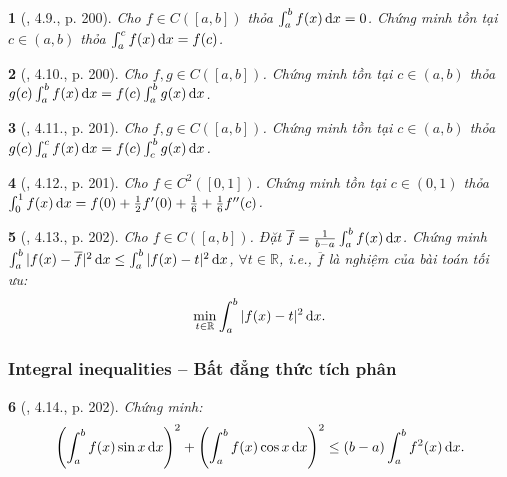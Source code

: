 \documentclass{article}
\newtheorem{baitoan}{}
\begin{document}
\begin{baitoan}[\cite{Quoc_Long_Dat_Nam_VMC}, 4.9., p. 200]
	Cho $f\in C([a,b])$ thỏa $\int_a^b f(x)\,{\rm d}x = 0$. Chứng minh tồn tại $c\in(a,b)$ thỏa $\int_a^c f(x)\,{\rm d}x = f(c)$.
\end{baitoan}

\begin{baitoan}[\cite{Quoc_Long_Dat_Nam_VMC}, 4.10., p. 200]
	Cho $f,g\in C([a,b])$. Chứng minh tồn tại $c\in(a,b)$ thỏa $g(c)\int_a^b f(x)\,{\rm d}x = f(c)\int_a^b g(x)\,{\rm d}x$.
\end{baitoan}

\begin{baitoan}[\cite{Quoc_Long_Dat_Nam_VMC}, 4.11., p. 201]
	Cho $f,g\in C([a,b])$. Chứng minh tồn tại $c\in(a,b)$ thỏa $g(c)\int_a^c f(x)\,{\rm d}x = f(c)\int_c^b g(x)\,{\rm d}x$.
\end{baitoan}

\begin{baitoan}[\cite{Quoc_Long_Dat_Nam_VMC}, 4.12., p. 201]
	Cho $f\in C^2([0,1])$. Chứng minh tồn tại $c\in(0,1)$ thỏa $\int_0^1 f(x)\,{\rm d}x = f(0) + \frac{1}{2}f'(0) + \frac{1}{6} + \frac{1}{6}f''(c)$.
\end{baitoan}

\begin{baitoan}[\cite{Quoc_Long_Dat_Nam_VMC}, 4.13., p. 202]
	Cho $f\in C([a,b])$. Đặt $\overline{f} = \frac{1}{b - a}\int_a^b f(x)\,{\rm d}x$. Chứng minh $\int_a^b |f(x) - \overline{f}|^2\,{\rm d}x\le\int_a^b |f(x) - t|^2\,{\rm d}x$, $\forall t\in\mathbb{R}$, i.e., $\overline{f}$ là nghiệm của bài toán tối ưu:
	\begin{equation*}
		\min_{t\in\mathbb{R}} \int_a^b |f(x) - t|^2\,{\rm d}x.
	\end{equation*}
\end{baitoan}


\subsubsection{Integral inequalities -- Bất đẳng thức tích phân}

\begin{baitoan}[\cite{Quoc_Long_Dat_Nam_VMC}, 4.14., p. 202]
	Chứng minh:
	\begin{equation*}
		\left(\int_a^b f(x)\sin x\,{\rm d}x\right)^2 + \left(\int_a^b f(x)\cos x\,{\rm d}x\right)^2\le(b - a)\int_a^b f^2(x)\,{\rm d}x.
	\end{equation*}
\end{baitoan}
\end{document}

